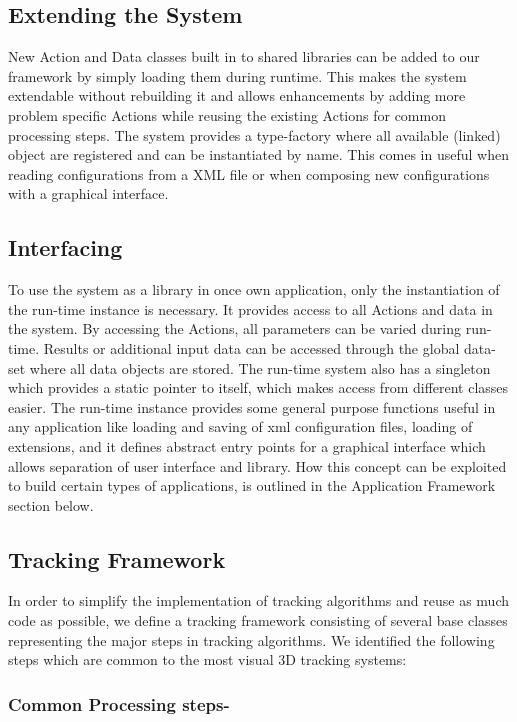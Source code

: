 \documentclass{article}
\begin{document}
\subsection{Extending the System }
\par New Action and Data classes built in to shared libraries can be added to our framework by simply loading them during runtime. This makes the system extendable without rebuilding it and allows enhancements by adding more problem speciﬁc Actions while reusing the existing Actions for common processing steps. The system provides a type-factory where all available (linked) object are registered and can be instantiated by name. This comes in useful when reading conﬁgurations from a XML ﬁle or when composing new conﬁgurations with a graphical interface.   

\subsection{Interfacing}
\par To use the system as a library in once own application, only the instantiation of the run-time instance is necessary. It provides access to all Actions and data in the system. By accessing the Actions, all parameters can be varied during run-time. Results or additional input data can be accessed through the global data-set where all data objects are stored. The run-time system also has a singleton which provides a static pointer to itself, which makes access from different  classes easier. The run-time instance provides some general purpose functions useful in any application like loading and saving of xml conﬁguration ﬁles, loading of extensions, and it deﬁnes abstract entry points for a graphical interface which allows separation of user interface and library. How this concept can be exploited to build certain types of applications, is outlined in the Application Framework section below. 

\subsection{Tracking Framework}
\par In order to simplify the implementation of tracking algorithms and reuse as much code as possible, we deﬁne a tracking framework consisting of several base classes representing the major steps in tracking algorithms. We identiﬁed the following steps which are common to the most visual 3D tracking systems:
\subsubsection{Common Processing steps- }
\end{document}
